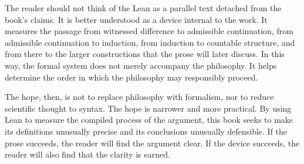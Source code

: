 The reader should not think of the Lean as a parallel text detached from the
book's claims. It is better understood as a device internal to the work. It
measures the passage from witnessed difference to admissible continuation, from
admissible continuation to induction, from induction to countable structure,
and from there to the larger constructions that the prose will later discuss.
In this way, the formal system does not merely accompany the philosophy. It
helps determine the order in which the philosophy may responsibly proceed.

The hope, then, is not to replace philosophy with formalism, nor to reduce
scientific thought to syntax. The hope is narrower and more practical. By
using Lean to measure the compiled process of the argument, this book seeks to
make its definitions unusually precise and its conclusions unusually
defensible. If the prose succeeds, the reader will find the argument clear. If
the device succeeds, the reader will also find that the clarity is earned.


